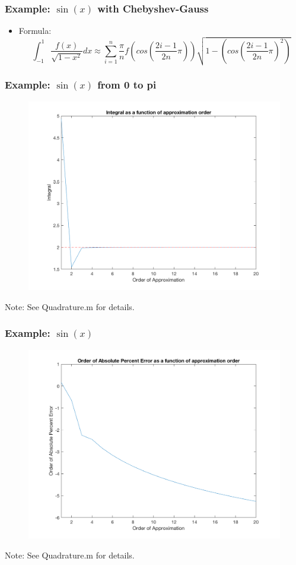 \documentclass{beamer}
\begin{document}
\begin{frame}
\frametitle[alignment=center]{Example: $\sin(x)$ with Chebyshev-Gauss}
\tiny
\begin{itemize}
\item Formula:
$$\int_{-1}^{1}\frac{f(x)}{\sqrt{1-x^2}}dx\approx \sum_{i=1}^n\frac{\pi}{n}f\left(cos\left(\frac{2i-1}{2n}\pi\right)\right)\sqrt{1-\left(cos\left(\frac{2i-1}{2n}\pi\right)^2\right)}$$
\end{itemize}
\end{frame}

\begin{frame}
\frametitle[alignment=center]{Example: $\sin(x)$ from 0 to pi}
\begin{figure}
\centering
\includegraphics[scale=0.5]{Quad_1.png}
\end{figure}
Note: See Quadrature.m for details.
\end{frame}

\begin{frame}
\frametitle[alignment=center]{Example: $\sin(x)$}
\begin{figure}
\centering
\includegraphics[scale=0.5]{Quad_2.png}
\end{figure}
Note: See Quadrature.m for details.
\end{frame}
\end{document}
